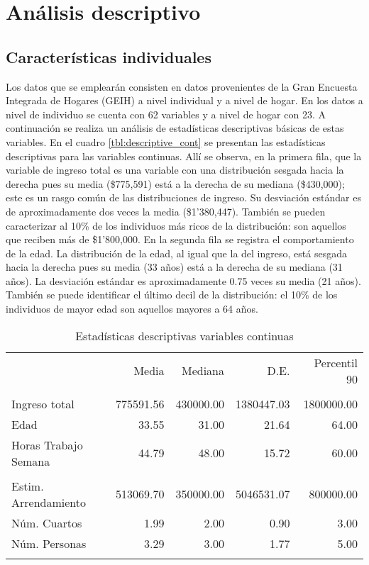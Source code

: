 \documentclass[11pt,a4paper]{article}
\begin{document}
\section{Análisis descriptivo}

\subsection{Características individuales}

Los datos que se emplearán consisten en datos provenientes de la Gran Encuesta Integrada de Hogares (GEIH) a nivel individual y a nivel de hogar. En los datos a nivel de individuo se cuenta con 62 variables y a nivel de hogar con 23. A continuación se realiza un análisis de estadísticas descriptivas básicas de estas variables. En el cuadro \ref{tbl:descriptive_cont} se presentan las estadísticas descriptivas para las variables continuas. Allí se observa, en la primera fila, que la variable de ingreso total es una variable con una distribución sesgada hacia la derecha pues su media (\$775,591) está a la derecha de su mediana (\$430,000); este es un rasgo común de las distribuciones de ingreso. Su desviación estándar es de aproximadamente dos veces la media (\$1'380,447). También se pueden caracterizar al 10\% de los individuos más ricos de la distribución: son aquellos que reciben más de \$1'800,000. En la segunda fila se registra el comportamiento de la edad. La distribución de la edad, al igual que la del ingreso, está sesgada hacia la derecha pues su media (33 años) está a la derecha de su mediana (31 años). La desviación estándar es aproximadamente 0.75 veces su media (21 años). También se puede identificar el último decil de la distribución: el 10\% de los individuos de mayor edad son aquellos mayores a 64 años. 

\begin{table}[H]
\centering
\caption{Estadísticas descriptivas variables continuas} 
\label{tab:descriptive_cont}
\begingroup\fontsize{9pt}{10pt}\selectfont
\begin{tabular}{lrrrr}
  \hline
\addlinespace
  & Media & Mediana & D.E. & Percentil 90 \\
\addlinespace
 \hline
  \addlinespace
\multicolumn{5}{l}{\textbf{\textit{Individuos}}} \\
\addlinespace
Ingreso total & 775591.56 & 430000.00 & 1380447.03 & 1800000.00 \\ 
  Edad & 33.55 & 31.00 & 21.64 & 64.00 \\ 
  Horas Trabajo Semana & 44.79 & 48.00 & 15.72 & 60.00 \\ 
   \addlinespace
\multicolumn{5}{l}{\textbf{\textit{Hogares}}} \\
\addlinespace
Estim. Arrendamiento & 513069.70 & 350000.00 & 5046531.07 & 800000.00 \\ 
  Núm. Cuartos & 1.99 & 2.00 & 0.90 & 3.00 \\ 
  Núm. Personas & 3.29 & 3.00 & 1.77 & 5.00 \\ 
   \addlinespace
\hline
\addlinespace
\end{tabular}
\endgroup
\end{table}
\end{document}
